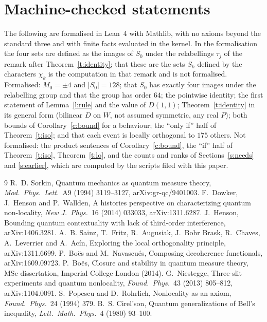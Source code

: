\documentclass[11pt,a4paper]{article}
\theoremstyle{definition}
\theoremstyle{remark}
\begin{document}
\section{Machine-checked statements}

The following are formalised in Lean~4 with Mathlib, with no axioms beyond the standard three and with
finite facts evaluated in the kernel. In the formalisation the four sets are defined as the images of
$S_0$ under the relabellings $\tau_j$ of the remark after Theorem~\ref{t:identity}; that these are the
sets $S_k$ defined by the characters $\chi_k$ is the computation in that remark and is not formalised.
Formalised: $M_0=\pm4$ and $|S_0|=128$; that $S_0$ has exactly four images under the relabelling group
and that the group has order $64$; the pointwise identity; the first statement of Lemma~\ref{l:rule} and
the value of $D(1,1)$; Theorem~\ref{t:identity} in its general form (bilinear $D$ on $W$, not assumed
symmetric, any real $P$); both bounds of Corollary~\ref{c:bound} for a behaviour; the ``only if'' half
of Theorem~\ref{t:iso}; and that each event is locally orthogonal to $175$ others. Not
formalised: the product sentences of Corollary~\ref{c:bound}, the ``if'' half of Theorem~\ref{t:iso},
Theorem~\ref{t:lo}, and the counts and ranks of Sections~\ref{s:needs} and \ref{s:earlier}, which are computed by the
scripts filed with this paper.

\begin{thebibliography}{9}
 R.~D. Sorkin, Quantum mechanics as quantum measure theory, \emph{Mod.\ Phys.\ Lett.}\
A9 (1994) 3119--3127, arXiv:gr-qc/9401003.
 F.~Dowker, J.~Henson and P.~Wallden, A histories perspective on characterizing quantum
non-locality, \emph{New J.\ Phys.}\ 16 (2014) 033033, arXiv:1311.6287.
\bibitem{Henson} J.~Henson, Bounding quantum contextuality with lack of third-order interference,
arXiv:1406.3281.
 A.~B. Sainz, T.~Fritz, R.~Augusiak, J.~Bohr Brask, R.~Chaves, A.~Leverrier and
A.~Ac\'in, Exploring the local orthogonality principle, arXiv:1311.6699.
\bibitem{BN} P.~Bo\"es and M.~Navascu\'es, Composing decoherence functionals, arXiv:1609.09723.
\bibitem{Boes} P.~Bo\"es, Closure and stability in quantum measure theory, MSc dissertation, Imperial
College London (2014).
 G.~Niestegge, Three-slit experiments and quantum nonlocality, \emph{Found.\ Phys.}\
43 (2013) 805--812, arXiv:1104.0091.
\bibitem{PR} S.~Popescu and D.~Rohrlich, Nonlocality as an axiom, \emph{Found.\ Phys.}\ 24 (1994) 379.
\bibitem{Tsirelson} B.~S. Cirel'son, Quantum generalizations of Bell's inequality, \emph{Lett.\ Math.\
Phys.}\ 4 (1980) 93--100.
\end{thebibliography}
\end{document}

